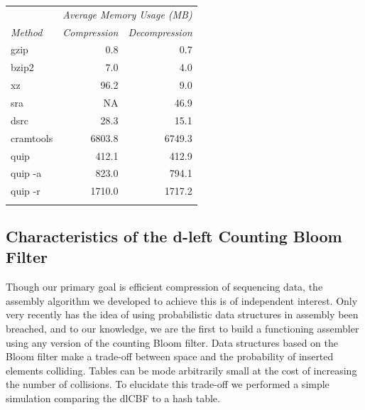 \documentclass[a4,center,fleqn]{NAR}
\begin{document}
\begin{table}
{
\begin{tabular}{@{}lrr@{}}
\toprule
                & \multicolumn{2}{c}{\textit{Average Memory Usage (MB)}} \\ \cline{2-3}
\textit{Method} & \textit{Compression} & \textit{Decompression} \\ \colrule
gzip            &     0.8              &    0.7 \\
bzip2           &     7.0              &    4.0 \\
xz              &    96.2              &    9.0 \\
sra             &      NA              &   46.9 \\
dsrc            &    28.3              &   15.1 \\
cramtools       &  6803.8              & 6749.3 \\
quip            &   412.1              &  412.9 \\
quip -a         &   823.0              &  794.1 \\
quip -r         &  1710.0              & 1717.2 \\ \botrule
\end{tabular}
}
{}
\end{table}



\subsection{Characteristics of the d-left Counting Bloom Filter}

\label{section:dlcbf_results}

Though our primary goal is efficient compression of sequencing data, the
assembly algorithm we developed to achieve this is of independent interest.
Only very recently has the idea of using probabilistic data structures in
assembly been breached, and to our knowledge, we are the first to build a
functioning assembler using any version of the counting Bloom filter. Data
structures based on the Bloom filter make a trade-off between space and
the probability of inserted elements colliding. Tables can be mode arbitrarily
small at the cost of increasing the number of collisions. To elucidate this
trade-off we performed a simple simulation comparing the dlCBF to a hash table.
\end{document}
